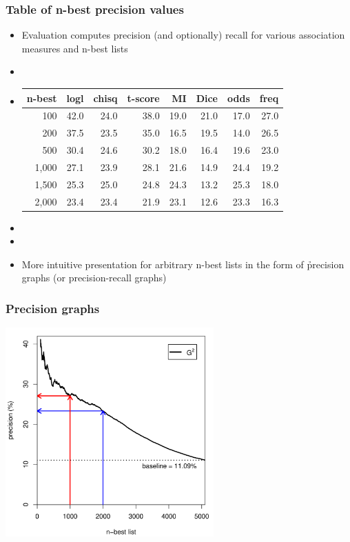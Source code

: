 \documentclass[handout,notes=show,t]{beamer} %
\begin{document}
\begin{frame}
  \frametitle{Table of n-best precision values}

  \begin{itemize}
  \item Evaluation computes precision (and optionally) recall for various
    association measures and n-best lists
  \item[]
  \item[]
    \begin{center}\small
      \begin{tabular}{r || r | r | r | r | r | r | r}
        n-best & logl & chisq & t-score & MI  & Dice & odds & freq \\
        \hline
         100   & 42.0 & 24.0 &   38.0  & 19.0 & 21.0 & 17.0 & 27.0 \\
         200   & 37.5 & 23.5 &   35.0  & 16.5 & 19.5 & 14.0 & 26.5 \\
         500   & 30.4 & 24.6 &   30.2  & 18.0 & 16.4 & 19.6 & 23.0 \\
       1,000   & 27.1 & 23.9 &   28.1  & 21.6 & 14.9 & 24.4 & 19.2 \\
       1,500   & 25.3 & 25.0 &   24.8  & 24.3 & 13.2 & 25.3 & 18.0 \\
       2,000   & 23.4 & 23.4 &   21.9  & 23.1 & 12.6 & 23.3 & 16.3
      \end{tabular}
    \end{center}
  \item[]
  \item[]
  \item More intuitive presentation for arbitrary n-best lists in the form of
    \h{precision graphs} (or precision-recall graphs)
  \end{itemize}
\end{frame}

\begin{frame}
  \frametitle{Precision graphs}

  \begin{center}
    \includegraphics[width=8cm]{img/mwe_eval_illustration}
  \end{center}
\end{frame}
\end{document}
